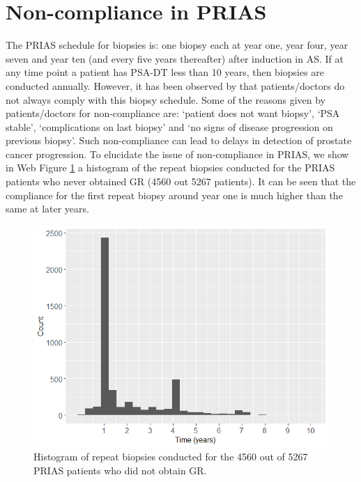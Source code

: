 
\section{Non-compliance in PRIAS}
The PRIAS schedule for biopsies is: one biopsy each at year one, year four, year seven and year ten (and every five years thereafter) after induction in AS. If at any time point a patient has PSA-DT less than 10 years, then biopsies are conducted annually. However, it has been observed by \citet{bokhorst2015compliance} that patients/doctors do not always comply with this biopsy schedule. Some of the reasons given by patients/doctors for non-compliance are: `patient does not want biopsy', `PSA stable', `complications on last biopsy' and `no signs of disease progression on previous biopsy'. Such non-compliance can lead to delays in detection of prostate cancer progression. To elucidate the issue of non-compliance in PRIAS, we show in Web Figure \ref{web_fig : non_compliance} a histogram of the repeat biopsies conducted for the PRIAS patients who never obtained GR (4560 out 5267 patients). It can be seen that the compliance for the first repeat biopsy around year one is much higher than the same at later years.

\begin{figure}
\centerline{
\includegraphics[width=\columnwidth]{images/non_compliance.png}
}
\caption{Histogram of repeat biopsies conducted for the 4560 out of 5267 PRIAS patients who did not obtain GR.}
\label{web_fig : non_compliance}
\end{figure}